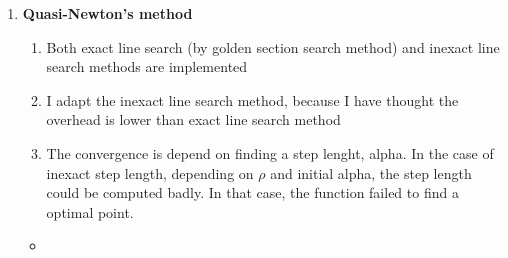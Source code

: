 \documentclass{standalone}
\begin{document}
\begin{enumerate}
\begin{enumerate}
        \newpage %
        \item \textbf{Quasi-Newton's method}
        \begin{enumerate}
          \item Both exact line search (by golden section search method) and inexact line search methods are implemented
          \item I adapt the inexact line search method, because I have thought the overhead is lower than exact line search method
          \item The convergence is depend on finding a step lenght, alpha. 
          In the case of inexact step length, depending on $\rho$ and initial alpha, the step length could be computed badly.
          In that case, the function failed to find a optimal point.
        \end{enumerate}
        \begin{itemize}[label=\quad,leftmargin=-5em]
          \item {}
        \end{itemize}
    \end{enumerate}
\end{enumerate}
\end{document}
